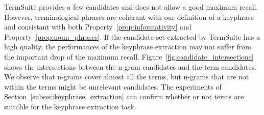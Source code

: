       TermSuite provides a few candidates and does not allow a good maximum
      recall. However, terminological phrases are coherant with our definition
      of a keyphrase and consistant with both Property~\ref{prop:informativity}
      and Property~\ref{prop:noun_phrases}. If the candidate set extracted by
      TermSuite has a high quality, the performances of the keyphrase extraction
      may not suffer from the important drop of the maximum recall.
      Figure~\ref{fig:candidate_intersections} shows the intersections between
      the n-gram candidates and the term candidates. We observe that n-grams
      cover almost all the terms, but n-grams that are not within the terms
      might be unrelevant candidates. The experiments of
      Section~\ref{subsec:keyphrase_extraction} can confirm whether or not terms
      are suitable for the keyphrase extraction task.
